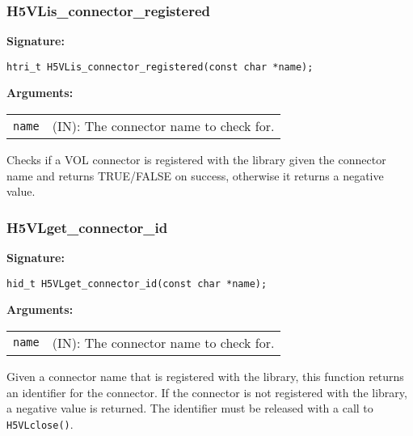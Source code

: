\subsubsection{H5VLis\_connector\_registered}
\begin{mdframed}[style=bgbox]
\textbf{Signature:}
\begin{lstlisting}
htri_t H5VLis_connector_registered(const char *name);
\end{lstlisting}
\textbf{Arguments:}\\
\begin{tabular}{l p{13.5cm}}
  {\tt name} & (IN): The connector name to check for.\\
\end{tabular}
\end{mdframed}
Checks if a VOL connector is registered with the library given the connector name and returns TRUE/FALSE on success, otherwise it returns a negative value.\bigskip


\subsubsection{H5VLget\_connector\_id}
\begin{mdframed}[style=bgbox]
\textbf{Signature:}
\begin{lstlisting}
hid_t H5VLget_connector_id(const char *name);
\end{lstlisting}
\textbf{Arguments:}\\
\begin{tabular}{l p{13.5cm}}
  {\tt name} & (IN): The connector name to check for.\\
\end{tabular}
\end{mdframed}
Given a connector name that is registered with the library, this function returns an identifier for the connector. If the connector is not registered with the library, a negative value is returned. The identifier must be released with a call to {\tt H5VLclose()}.\bigskip


